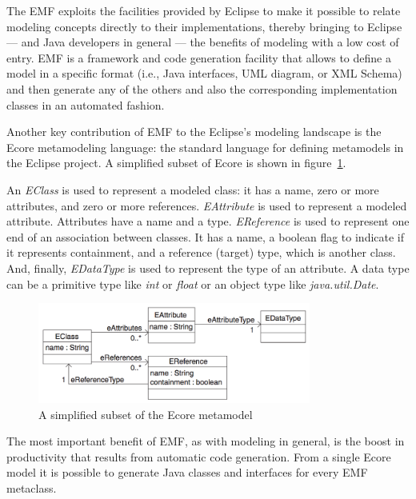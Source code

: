 \documentclass[
  10pt,				%
  oneside,
  a4paper,			%
  brazilian,
  english
]{abntex2}
\begin{document}
The EMF exploits the facilities provided by Eclipse to make it possible to relate
modeling concepts directly to their implementations, thereby bringing to Eclipse
— and Java developers in general — the benefits of modeling with a low cost of entry.
%
EMF is a framework and code generation facility that allows to define a model in
a specific format (i.e., Java interfaces, UML diagram, or XML Schema) and then
generate any of the others and also the corresponding implementation classes in
an automated fashion.

Another key contribution of EMF to the Eclipse's modeling landscape is the Ecore
metamodeling language: the standard language for defining metamodels in
the Eclipse project. A simplified subset of Ecore is shown in figure~\ref{fig:ecore_fragment}.

An \emph{EClass} is used to represent a modeled class: it has a name, zero or more
attributes, and zero or more references.
\emph{EAttribute} is used to represent a modeled attribute. Attributes have a
name and a type.
\emph{EReference} is used to represent one end of an association between classes.
It has a name, a boolean flag to indicate if it represents containment, and a
reference (target) type, which is another class.
And, finally, \emph{EDataType} is used to represent the type of an attribute.
A data type can be a primitive type like \emph{int} or \emph{float} or an object
type like \emph{java.util.Date}.

\begin{figure}
\includegraphics[width=0.8\textwidth]{images/ecore_fragment}
\caption{A simplified subset of the Ecore metamodel \protect\cite{budinsky09}}
\label{fig:ecore_fragment}
\end{figure}


The most important benefit of EMF, as with modeling in general, is the boost in
productivity that results from automatic code generation. From a single Ecore
model it is possible to generate Java classes and interfaces for every EMF metaclass.
\end{document}
